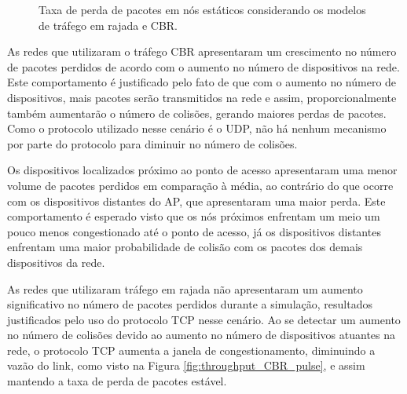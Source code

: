 \documentclass[12pt]{article}
\begin{document}
\begin{figure}[H]
\begin{center}
{%
\setlength{\fboxsep}{2pt}%
\setlength{\fboxrule}{1pt}%
%
}
\end{center}
\caption{Taxa de perda de pacotes em nós estáticos considerando os modelos de tráfego em rajada e CBR.}
\label{fig:lostPackets_static}
\end{figure}

As redes que utilizaram o tráfego CBR apresentaram um crescimento no número de pacotes perdidos de acordo com o aumento no número de dispositivos na rede. Este comportamento é justificado pelo fato de que com o aumento no número de dispositivos, mais pacotes serão transmitidos na rede e assim, proporcionalmente também aumentarão o número de colisões, gerando maiores perdas de pacotes. Como o protocolo utilizado nesse cenário é o UDP, não há nenhum mecanismo por parte do protocolo para diminuir no número de colisões.

Os dispositivos localizados próximo ao ponto de acesso apresentaram uma menor volume de pacotes perdidos em comparação à média, ao contrário do que ocorre com os dispositivos distantes do AP, que apresentaram uma maior perda. Este comportamento é esperado visto que os nós próximos enfrentam um meio um pouco menos congestionado até o ponto de acesso, já os dispositivos distantes enfrentam uma maior probabilidade de colisão com os pacotes dos demais dispositivos da rede.

As redes que utilizaram tráfego em rajada não apresentaram um aumento significativo no número de pacotes perdidos durante a simulação, resultados justificados pelo uso do protocolo TCP nesse cenário. Ao se detectar um aumento no número de colisões devido ao aumento no número de dispositivos atuantes na rede, o protocolo TCP aumenta a janela de congestionamento, diminuindo a vazão do link, como visto na Figura \ref{fig:throughput_CBR_pulse}, e assim mantendo a taxa de perda de pacotes estável.
\end{document}
